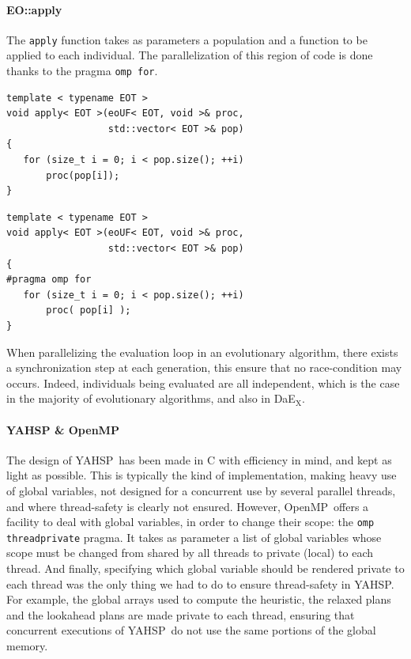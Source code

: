 \documentclass{sig-alternate}
\newcommand{\DAEX}{{\sc DaE$_{\text{X}}$}}
\newcommand{\YAHSP}{{\sc YAHSP}}
\newcommand{\OPENMP}{{\sc OpenMP}}
\begin{document}
\paragraph{EO::apply}
The {\tt apply} function takes as parameters a population and a function to be applied to each individual.
The parallelization of this region of code is done thanks to the pragma {\tt omp for}.

\begin{algorithm}[h!]
\caption{apply(proc, pop)}
\vspace{0.2cm}
\begin{verbatim}
template < typename EOT >
void apply< EOT >(eoUF< EOT, void >& proc, 
                  std::vector< EOT >& pop)
{
   for (size_t i = 0; i < pop.size(); ++i) 
       proc(pop[i]);
}
\end{verbatim}
\vspace{-0.2cm}
\end{algorithm}

\begin{algorithm}[h!]
\caption{apply(proc, pop) parallelized using \OPENMP}
\vspace{0.2cm}
\begin{verbatim}
template < typename EOT >
void apply< EOT >(eoUF< EOT, void >& proc,
                  std::vector< EOT >& pop)
{
#pragma omp for
   for (size_t i = 0; i < pop.size(); ++i)
       proc( pop[i] );
}
\end{verbatim}
\vspace{-0.2cm}
\end{algorithm}

When parallelizing the evaluation loop in an evolutionary algorithm,
there exists a synchronization step at each generation, this ensure that no race-condition
may occurs. Indeed, individuals being evaluated are all independent, which is
the case in the majority of evolutionary algorithms, and also in \DAEX.

\paragraph{YAHSP \& OpenMP}
The design of \YAHSP\ has been made in C with efficiency in mind, and kept as
light as possible. This is typically the kind of implementation, making heavy
use of global variables, not designed for a concurrent use by several parallel
threads, and where thread-safety is clearly not ensured. However, \OPENMP\ offers
a facility to deal with global variables, in order to change their scope: the
{\tt omp threadprivate} pragma. It takes as parameter a list of global variables
whose scope must be changed from shared by all threads to private (local) to
each thread. And finally, specifying which global variable should be rendered
private to each thread was the only thing we had to do to ensure thread-safety
in \YAHSP. For example, the global arrays used to compute the heuristic, the
relaxed plans and the lookahead plans are made private to each thread, ensuring
that concurrent executions of \YAHSP\ do not use the same portions of the global
memory.
\end{document}
